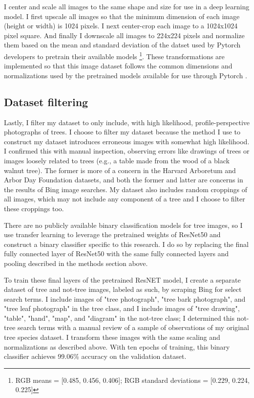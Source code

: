 \documentclass[10pt,twocolumn,letterpaper]{article}
\begin{document}
I center and scale all images to the same shape and size for use in a deep learning model. I first upscale all images so that the minimum dimension of each image (height or width) is 1024 pixels. I next center-crop each image to a 1024x1024 pixel square. And finally I downscale all images to 224x224 pixels and normalize them based on the mean and standard deviation of the datset used by Pytorch developers to pretrain their available models \footnote{RGB means = [0.485, 0.456, 0.406]; RGB standard deviations = [0.229, 0.224, 0.225]}. These transformations are implemented so that this image dataset follows the common dimensions and normalizations used by the pretrained models available for use through Pytorch \cite{PyTorch}. 

\subsection{Dataset filtering}

Lastly, I filter my dataset to only include, with high likelihood, profile-perspective photographs of trees. I choose to filter my dataset because the method I use to construct my dataset introduces erroneous images with somewhat high likelihood. I confirmed this with manual inspection, observing errors like drawings of trees or images loosely related to trees (e.g., a table made from the wood of a black walnut tree). The former is more of a concern in the Harvard Arboretum and Arbor Day Foundation datasets, and both the former and latter are concerns in the results of Bing image searches. My dataset also includes random croppings of all images, which may not include any component of a tree and I choose to filter these croppings too.

There are no publicly available binary classification models for tree images, so I use transfer learning to leverage the pretrained weights of ResNet50 and construct a binary classifier \cite{ResNET} specific to this research. I do so by replacing the final fully connected layer of ResNet50 with the same fully connected layers and pooling described in the methods section above.

To train these final layers of the pretrained ResNET model, I create a separate dataset of tree and not-tree images, labeled as such, by scraping Bing for select search terms. I include images of "tree photograph", "tree bark photograph", and "tree leaf photograph" in the tree class, and I include images of "tree drawing", "table", "hand", "map", and "diagram" in the not-tree class; I determined this not-tree search terms with a manual review of a sample of observations of my original tree species dataset. I transform these images with the same scaling and normalizations as described above. With ten epochs of training, this binary classifier achieves 99.06\% accuracy on the validation dataset. 
\end{document}
